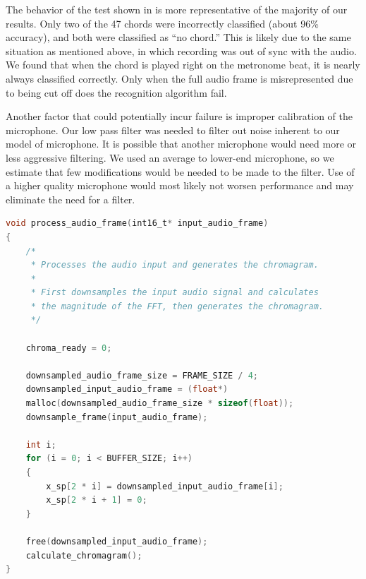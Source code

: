 \documentclass[journal]{IEEEtran}
\begin{document}
The behavior of the test shown in  is more representative of the majority of our results.
Only two of the 47 chords were incorrectly classified (about 96\% accuracy), and both were classified as “no chord.” This is likely due to the same situation as mentioned above, in which recording was out of sync with the audio.
We found that when the chord is played right on the metronome beat, it is nearly always classified correctly.
Only when the full audio frame is misrepresented due to being cut off does the recognition algorithm fail.

Another factor that could potentially incur failure is improper calibration of the microphone.
Our low pass filter was needed to filter out noise inherent to our model of microphone.
It is possible that another microphone would need more or less aggressive filtering.
We used an average to lower-end microphone, so we estimate that few modifications would be needed to be made to the filter.
Use of a higher quality microphone would most likely not worsen performance and may eliminate the need for a filter.






\onecolumn
\begin{lstlisting}[language = C, frame = single, caption = {An example code snippet of the \texttt{process\_audio\_frame()} function during out chroma feature extraction process.
This function is located in the \texttt{chromagram.c} file.}, captionpos = b, label = code:audio]
void process_audio_frame(int16_t* input_audio_frame)
{
    /*
     * Processes the audio input and generates the chromagram.
     *
     * First downsamples the input audio signal and calculates 
     * the magnitude of the FFT, then generates the chromagram.
     */

    chroma_ready = 0;

    downsampled_audio_frame_size = FRAME_SIZE / 4;
    downsampled_input_audio_frame = (float*)
    malloc(downsampled_audio_frame_size * sizeof(float));
    downsample_frame(input_audio_frame);

    int i;
    for (i = 0; i < BUFFER_SIZE; i++)
    {
        x_sp[2 * i] = downsampled_input_audio_frame[i];
        x_sp[2 * i + 1] = 0;
    }

    free(downsampled_input_audio_frame);
    calculate_chromagram();
}
\end{lstlisting}
\end{document}
